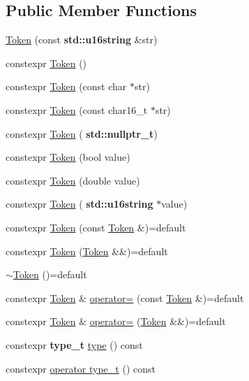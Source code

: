 \subsection*{Public Member Functions}
\begin{DoxyCompactItemize}
\item 
\hyperlink{class_token_a5fcfb5de8c671eb8c4b5acaf13e3e67c}{Token} (const \textbf{ std\+::u16string} \&str)
\item 
constexpr \hyperlink{class_token_aebaa2e391d98c62d1afbe02450e7f982}{Token} ()
\item 
constexpr \hyperlink{class_token_a344a67da48166ca3809eb253f0c60e64}{Token} (const char $\ast$str)
\item 
constexpr \hyperlink{class_token_aeb65258a7c79cb54feb7633e89281897}{Token} (const char16\+\_\+t $\ast$str)
\item 
constexpr \hyperlink{class_token_a8d79a7b0e4e2be8f481096f85c4431f3}{Token} (\textbf{ std\+::nullptr\+\_\+t})
\item 
constexpr \hyperlink{class_token_aa22bec7203c8206f34233f17e41c3187}{Token} (bool value)
\item 
constexpr \hyperlink{class_token_a8a60cd16e3e648204849506898a988c5}{Token} (double value)
\item 
constexpr \hyperlink{class_token_ad12059c7d3ba95df57a4684c05b6ca97}{Token} (\textbf{ std\+::u16string} $\ast$value)
\item 
constexpr \hyperlink{class_token_a6cf4d1944e2b5714735ed54e3f9651d0}{Token} (const \hyperlink{class_token}{Token} \&)=default
\item 
constexpr \hyperlink{class_token_a23120d04c491e1808de2c15a5f9de2a1}{Token} (\hyperlink{class_token}{Token} \&\&)=default
\item 
\hyperlink{class_token_aa192083f24d5d5895ad91b20ff0e3399}{$\sim$\+Token} ()=default
\item 
constexpr \hyperlink{class_token}{Token} \& \hyperlink{class_token_af5948f6aab6e746efaae099c750f348f}{operator=} (const \hyperlink{class_token}{Token} \&)=default
\item 
constexpr \hyperlink{class_token}{Token} \& \hyperlink{class_token_a7fb2d2c0d997137887d41037f47a39ac}{operator=} (\hyperlink{class_token}{Token} \&\&)=default
\item 
constexpr \textbf{ type\+\_\+t} \hyperlink{class_token_ae2fdb5eb7109dfb00927d8f9545070c8}{type} () const
\item 
constexpr \hyperlink{class_token_ad220dacaa53b1cf602441212ade6d83f}{operator type\+\_\+t} () const

\end{DoxyCompactItemize}
